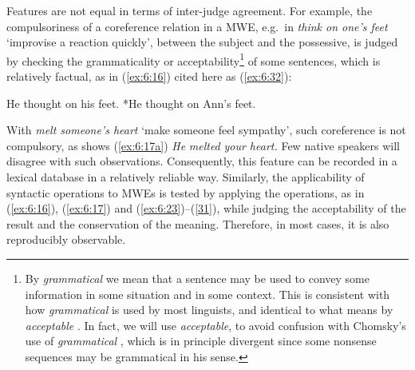 \documentclass[output=paper]{langsci/langscibook}
\begin{document}
Features are not equal in terms of inter-judge agreement. For example, the compulsoriness of a coreference relation in a MWE, e.g.~in \textit{think on one’s feet} ‘improvise a reaction quickly’, between the subject and the possessive, is judged by checking the grammaticality or acceptability\footnote{ By \textit{grammatical} we mean that a sentence may be used to convey some information in some situation and in some context. This is consistent with how \textit{grammatical} is used by most linguists, and identical to what \citet[293]{Harris1957} means by \textit{acceptable} \citep[161]{Ross1979}. In fact, we will use \textit{acceptable}, to avoid confusion with Chomsky’s  use of \textit{grammatical} \citep[15]{Chomsky1957}, which is in principle divergent since some nonsense sequences may be grammatical in his sense.}  of some sentences, which is relatively factual, as in (\ref{ex:6:16}) cited here as (\ref{ex:6:32}):

\begin{exe}
\ex \label{ex:6:32} 
\begin{xlist}
\ex \label{ex:6:32a}
He thought on his feet.
\ex \label{ex:6:32b}
*He thought on Ann’s feet.
\end{xlist}
\end{exe}


\noindent With \textit{melt someone’s heart} ‘make someone feel sympathy’, such coreference is not compulsory, as shows (\ref{ex:6:17a}) \textit{He} \textit{melted}\textit{ your heart.} Few native speakers will disagree with such observations. Consequently, this feature can be recorded in a lexical database in a relatively reliable way. Similarly, the applicability of syntactic operations to MWEs is tested by applying the operations, as in (\ref{ex:6:16}), (\ref{ex:6:17}) and (\ref{ex:6:23})–(\ref{31}), while judging the acceptability of the result and the conservation of the meaning. Therefore, in most cases, it is also reproducibly observable.
\end{document}
